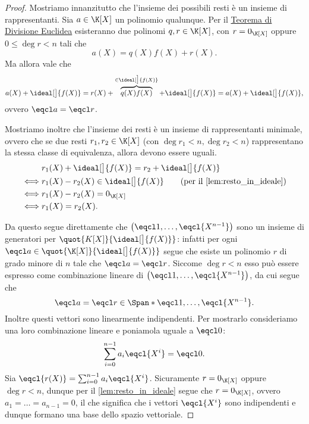 \begin{proof}
    Mostriamo innanzitutto che l'insieme dei possibili resti è un insieme di rappresentanti. Sia $a \in \K[X]$ un polinomio qualunque. Per il \hyperref[th:divisione_euclidea_KX]{Teorema di Divisione Euclidea} esisteranno due polinomi $q, r \in \K[X]$, con $r = 0_{\K[X]}$ oppure $0 \leq \deg r < n$ tali che \[
        a(X) = q(X)f(X) + r(X).    
    \] Ma allora vale che \[
        a(X) + \ideal[\big]{f(X)} = r(X) + \overbrace{q(X)f(X)}^{\in \ideal[\big]{f(X)}} +  \ideal[\big]{f(X)} = a(X) + \ideal[\big]{f(X)},
    \] ovvero $\eqcl a = \eqcl r$.

    Mostriamo inoltre che l'insieme dei resti è un insieme di rappresentanti minimale, ovvero che se due resti $r_1, r_2 \in \K[X]$ (con $\deg r_1 < n, \deg r_2 < n$) rappresentano la stessa classe di equivalenza, allora devono essere uguali.
    \begin{align*}
        &r_1(X) + \ideal[\big]{f(X)} = r_2 + \ideal[\big]{f(X)} \\
        \iff &r_1(X) - r_2(X) \in \ideal[\big]{f(X)} \tag{per il \autoref{lem:resto_in_ideale}}\\
        \iff &r_1(X) - r_2(X) = 0_{\K[X]}\\
        \iff &r_1(X) = r_2(X).
    \end{align*}

    Da questo segue direttamente che $\left( \eqcl 1, \dots, \eqcl{X^{n-1}} \right)$ sono un insieme di generatori per $\quot{K[X]}{\ideal[\big]{f(X)}}$: infatti per ogni $\eqcl a \in \quot{\K[X]}{\ideal[\big]{f(X)}}$ segue che esiste un polinomio $r$ di grado minore di $n$ tale che $\eqcl a = \eqcl r$. Siccome $\deg r < n$ esso può essere espresso come combinazione lineare di $\left( \eqcl 1, \dots, \eqcl{X^{n-1}} \right)$, da cui segue che \[
        \eqcl a = \eqcl r \in \Span*{\eqcl 1, \dots, \eqcl{X^{n-1}}}.
    \] Inoltre questi vettori sono linearmente indipendenti. Per mostrarlo consideriamo una loro combinazione lineare e poniamola uguale a $\eqcl 0$: \begin{align*}
        \sum_{i = 0}^{n-1} a_i\eqcl{X^i} = \eqcl 0.
    \end{align*} Sia $\eqcl{r(X)} = \sum_{i = 0}^{n-1} a_i\eqcl{X^i}$. Sicuramente $r = 0_{\K[X]}$ oppure $\deg r < n$, dunque per il \autoref{lem:resto_in_ideale} segue che $r = 0_{\K[X]}$, ovvero $a_1 = \dots = a_{n-1} = 0$, il che significa che i vettori $\eqcl{X^i}$ sono indipendenti e dunque formano una base dello spazio vettoriale.
\end{proof}

